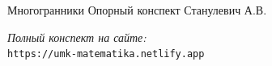 \documentclass{umk-matematika}
\begin{document}
\maketitlepage
    {Многогранники}
    {Опорный конспект}
    {Станулевич А.В.}

\begin{center}
\vspace{1.5cm}
\textit{Полный конспект на сайте:}\\
\texttt{https://umk-matematika.netlify.app}
\end{center}
\end{document}
